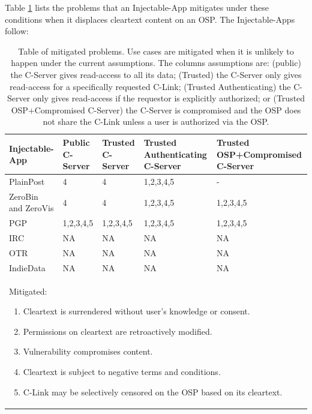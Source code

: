 \documentclass[letterpaper,twocolumn,10pt]{article}
\begin{document}
Table \ref{tab:use_cases_served} lists the problems that an Injectable-App mitigates under these conditions when it displaces cleartext content on an OSP.
The Injectable-Apps follow:

\begin{table}
    \begin{tabular}{|p{3.2cm}|p{2.5cm}|p{2.5cm}|p{2.5cm}|p{2.5cm}|}
        \hline
        \textbf{Injectable-App} & \textbf{Public C-Server} & \textbf{Trusted C-Server} & \textbf{Trusted Authenticating C-Server} & \textbf{Trusted OSP+Compromised C-Server}                                                                                                                                                                                              \\ \hline
        PlainPost               & 4                & 4         & 1,2,3,4,5  & -           \\ \hline
        ZeroBin and ZeroVis     & 4                & 4         & 1,2,3,4,5  & 1,2,3,4,5   \\ \hline
        PGP                     & 1,2,3,4,5        & 1,2,3,4,5 & 1,2,3,4,5  & 1,2,3,4,5   \\ \hline
        IRC                     & NA               & NA        & NA         & NA          \\ \hline
        OTR                     & NA               & NA        & NA         & NA          \\ \hline
        IndieData               & NA               & NA        & NA         & NA          \\ \hline
        \multicolumn{5}{|p{16.0cm}|}{
        {
          \footnotesize
          Mitigated:          
          \begin{enumerate}
          \setlength{\itemsep}{1pt}
          \setlength{\parskip}{0pt}
          \setlength{\parsep}{1pt}
          \item Cleartext is surrendered without user's knowledge or consent.
          \item Permissions on cleartext are retroactively modified.
          \item Vulnerability compromises content.
          \item Cleartext is subject to negative terms and conditions. 
          \item C-Link may be selectively censored on the OSP based on its cleartext.
      \end{enumerate}
      }
      } \\
      \hline
    \end{tabular}
    \caption{
    Table of mitigated problems. 
    Use cases are mitigated when it is unlikely to happen under the current assumptions. The columns assumptions are:
    (public) the C-Server gives read-access to all its data; (Trusted) the C-Server only gives read-access for a specifically requested C-Link;
    (Trusted Authenticating) the C-Server only gives read-access if the requestor is explicitly authorized; or
    (Trusted OSP+Compromised C-Server) the C-Server is compromised and the OSP does not share the C-Link unless a user is authorized via the OSP.
             }
    \label{tab:use_cases_served}
	

\end{table}
\end{document}
